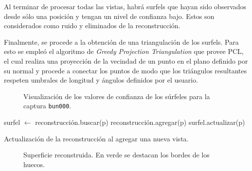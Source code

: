 	Al terminar de procesar todas las vistas, habrá surfels que hayan sido
	observados desde sólo una posición y tengan un nivel de confianza bajo.
	Estos son considerados como ruido y eliminados de la
	reconstrucción.

	Finalmente, se procede a la obtención de una triangulación de los surfels.
	Para esto se empleó el algoritmo de \emph{Greedy Projection Triangulation} que provee PCL,
	el cual realiza una proyección de la vecindad de un punto en el plano definido por su normal
	y procede a conectar los puntos de modo que los triángulos resultantes
	respeten umbrales de longitud y ángulos definidos por el usuario.

	\begin{figure}
		\caption{\label{fig:confianza_surfel}Visualización de los valores de confianza de los súrfeles para la captura \texttt{bun000}.}
	\end{figure}


	\begin{algorithm}
		\begin{algorithmic}[1]
					\State surfel $\gets$ reconstrucción.buscar(p)
						\State reconstrucción.agregar(p)
					\Else
						\State surfel.actualizar(p)
					\EndIf
				\EndFor
			\EndFunction
		\end{algorithmic}
		\caption{\label{alg:surfel}Actualización de la reconstrucción al agregar una nueva vista.}
	\end{algorithm}

	\begin{figure}

		\caption{\label{fig:surface}Superficie reconstruida. En verde se destacan los bordes de los huecos.}
	\end{figure}
